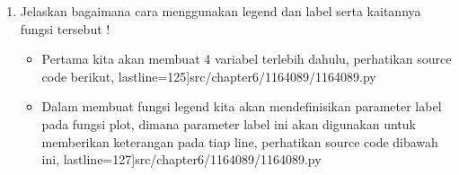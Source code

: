 \begin{enumerate}
\begin{itemize}
		         \begin{figure}[!htbp!]
				\centerline{\texttt{[image: figures/chapter6/1164089/YNC6-5.png]}}
				\caption{Fungsi Area Plot.}
				\label{YNC6-5}
			\end{figure}

		\item Pie Plot, dimana pada fungsi ini akan digunakan dalam menunjukkan presentase yang mewakili setiap kategori, untuk 			         membuatnya perhatikan source code dibawah dan hasilnya akan ditampilkan pada figure \ref{YNC6-6}.
		          lastline=104]{src/chapter6/1164089/1164089.py}

		         \begin{figure}[!htbp!]
				\centerline{\texttt{[image: figures/chapter6/1164089/YNC6-6.png]}}
				\caption{Fungsi Pie Plot.}
				\label{YNC6-6}
			\end{figure}

		\item Line Graphic, dimana fungsi ini akan melakukan plot dengan bentuk line, untuk membuatnya perhatikan source code 			         dibawah dan hasilnya akan ditampilkan pada figure \ref{YNC6-7}.
		          lastline=116]{src/chapter6/1164089/1164089.py}

		         \begin{figure}[!htbp!]
				\centerline{\texttt{[image: figures/chapter6/1164089/YNC6-7.png]}}
				\caption{Fungsi Line Graphic.}
				\label{YNC6-7}
			\end{figure}

	\end{itemize}

\item Jelaskan bagaimana cara menggunakan legend dan label serta kaitannya fungsi tersebut !
	
	\begin{itemize}

		\item Pertama kita akan membuat 4 variabel terlebih dahulu, perhatikan source code berikut,
		          lastline=125]{src/chapter6/1164089/1164089.py}

		\item Dalam membuat fungsi legend kita akan mendefinisikan parameter label pada fungsi plot, dimana parameter label ini 			         akan digunakan untuk memberikan keterangan pada tiap line, perhatikan source code dibawah ini,
		          lastline=127]{src/chapter6/1164089/1164089.py}


\end{itemize}
\end{enumerate}
